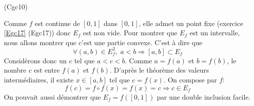 \begin{tiny}(Cgc10)\end{tiny} Comme $f$ est continue de $[0,1]$ dans $[0,1]$, elle admet un point fixe (exercice \ref{Egc17} (Egc17)) donc $E_f$ est non vide. Pour montrer que $E_f$ est un intervalle, nous allons montrer que c'est une partie convexe. C'est à dire que
\begin{displaymath}
\forall (a,b) \in E_f^2,\; a < b \Rightarrow [a,b] \subset E_f 
\end{displaymath}
Considérons donc un $c$ tel que $a<c<b$. Comme $a=f(a)$ et $b=f(b)$, le nombre $c$ est entre $f(a)$ et $f(b)$. D'après le théorème des valeurs intermédiaires, il existe $x\in [a,b]$ tel que $c = f(x)$. On compose par $f$:
\begin{displaymath}
 f(c) = f\circ f(x) = f(x) = c \Rightarrow c \in E_f
\end{displaymath}
On pouvait aussi démontrer que $E_f = f([0,1])$ par une double inclusion facile.